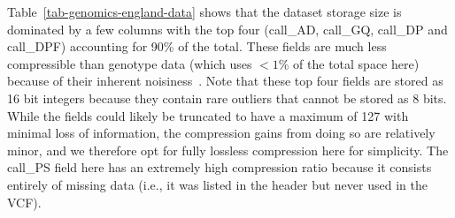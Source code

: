 \documentclass[a4paper,num-refs]{oup-contemporary}
\begin{document}
\begin{table}
\begin{tabular}{llS[table-format=3.1]S[table-format=3.2]S[table-format=3.2]}
\bottomrule
\end{tabular}
\end{table}

Table~\ref{tab-genomics-england-data} shows that the dataset storage
size is dominated by a few columns with the top four
(call\_AD, call\_GQ, call\_DP and call\_DPF) accounting for
90\% of the total. These fields are much less compressible
than genotype data (which uses $<1\%$ of the total space here)
because of their inherent noisiness~\citep{lin2020sparse}.
Note that these top four fields are stored as 16 bit integers
because they contain rare outliers that cannot be stored as
8 bits. While the fields could likely be truncated to have
a maximum of 127 with minimal loss of information,
the compression gains from doing so are relatively minor,
and we therefore opt for fully lossless compression here
for simplicity. The call\_PS field here has an extremely high
compression ratio because it consists entirely of missing data
(i.e., it was listed in the header but never used in the VCF).
\end{document}

